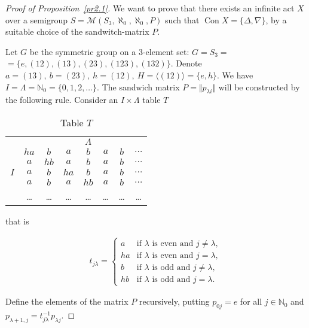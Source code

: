 \documentclass{birkau}
\numberwithin{equation}{section}
\theoremstyle{plain}
\theoremstyle{definition}
\DeclareMathOperator{\Con}{Con}
\begin{document}
	\begin{proof}[Proof of Proposition~\ref{pr2.1}]
    	We want to prove that there exists an infinite act $X$ over a semigroup $S = \mathcal{M}(S_3, \aleph_0, \aleph_0, P)$ such that $\Con X = \{ \Delta, \nabla \}$, by a suitable choice of the sandwitch-matrix $P$.
    	
    	Let $G$ be the symmetric group on a 3-element set: $G = S_3 = $ \newline $ =  \{e,(12),(13),(23),(123),(132)\}$. Denote $a = (13),\ b = (23),\ h = (12),\ H = \langle (12) \rangle = \{e,h\}$. We have $I = \Lambda = \mathbb{N}_0 = \{0,1,2,\ldots \}$. The sandwich matrix $P = \Vert p_{\lambda i} \Vert$ will be constructed by the following rule. Consider an $I \times \Lambda$ table $T$
    	\begin{table}[h]
    		\begin{center}
    			\begin{tabular}{cccccccc}
    					&  & & & $\Lambda$ & \\
    					& $ha$ & $b$ & $a$ & $b$ & $a$ & $b$ & $\dots$ \\
    					& $a$ & $hb$ & $a$ & $b$ & $a$ & $b$ & $\dots$ \\
    				$I$	& $a$ & $b$ & $ha$ & $b$ & $a$ & $b$ & $\dots$ \\
    					& $a$ & $b$ & $a$ & $hb$ & $a$ & $b$ & $\dots$ \\
    					& \ldots & \ldots & \ldots & \ldots & \ldots & \ldots & \ldots
    			\end{tabular}
    			\caption{Table $T$} \label{table1}
    		\end{center}
    		that is
    	\end{table}
    	\begin{gather*}
    		t_{j \lambda} =
    		\begin{cases}
    			a&\text{if $\lambda$ is even and } j \neq \lambda,\\
    			ha&\text{if $\lambda$ is even and } j = \lambda,\\
    			b&\text{if $\lambda$ is odd and } j \neq \lambda,\\
    			hb&\text{if $\lambda$ is odd and } j = \lambda.
    		\end{cases}
    	\end{gather*}
    	
    	Define the elements of the matrix $P$ recursively, putting $p_{0j} = e$ for all $j \in \mathbb{N}_0$ and $p_{\lambda + 1,j} = t_{j \lambda}^{-1} p_{\lambda j}$.
    	

\end{proof}
\end{document}

